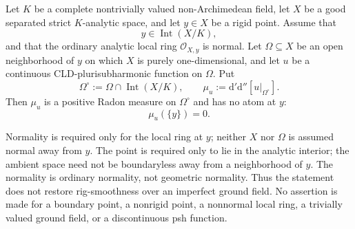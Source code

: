 
\begin{lemma}
\label{lem:p21p3-componentwise-normal-rigid-zero-atom}
Let $K$ be a complete nontrivially valued non-Archimedean field, let $X$ be
a good separated strict $K$-analytic space, and let $y\in X$ be a rigid
point.  Assume that
\[
                         y\in\operatorname{Int}(X/K),
\]
and that the ordinary analytic local ring $\mathcal O_{X,y}$ is normal.
Let $\Omega\subseteq X$ be an open neighborhood of $y$ on which $X$ is
purely one-dimensional, and let $u$ be a continuous
CLD-plurisubharmonic function on $\Omega$.  Put
\[
 \Omega^\circ:=\Omega\cap\operatorname{Int}(X/K),
 \qquad
 \mu_u:=\mathrm d'\mathrm d''[u|_{\Omega^\circ}].
\]
Then $\mu_u$ is a positive Radon measure on $\Omega^\circ$ and has no atom
at $y$:
\begin{equation}
\label{eq:p213-normal-rigid-zero-atom}
                         \mu_u(\{y\})=0.
\end{equation}
\end{lemma}

\begin{remark}
\label{rem:p213-normal-rigid-zero-atom-scope}
Normality is required only for the local ring at $y$; neither $X$ nor
$\Omega$ is assumed normal away from $y$.  The point is required only to
lie in the analytic interior; the ambient space need not be boundaryless
away from a neighborhood of $y$.  The normality is ordinary normality, not
geometric normality.  Thus the statement does not restore rig-smoothness
over an imperfect ground field.  No assertion is made for a boundary point,
a nonrigid point, a nonnormal local ring, a trivially valued ground field,
or a discontinuous psh function.
\end{remark}
